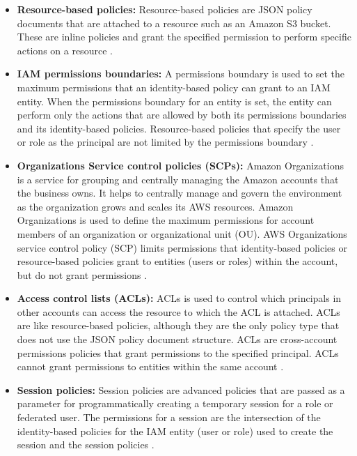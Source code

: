 \begin{itemize}
    \item \textbf{Resource-based policies:} Resource-based policies are JSON policy documents that are attached to a
    resource
    such as an Amazon S3 bucket. These are inline policies and grant the specified permission to perform specific actions on a resource \cite{25}.
\end{itemize}
\begin{itemize}
    \item \textbf{IAM permissions boundaries:} A permissions boundary is used to set the maximum permissions that an
    identity-based policy can grant to an IAM entity. When the permissions boundary for an entity is set, the entity can perform only the actions that are allowed by both its permissions boundaries and its identity-based policies. Resource-based policies that specify the user or role as the principal are not limited by the permissions boundary \cite{25}.
\end{itemize}
\begin{itemize}
    \item \textbf{Organizations Service control policies (SCPs):} Amazon Organizations is a service for grouping and centrally managing the Amazon accounts that the business owns. It helps to centrally manage and govern the environment as the organization grows and scales its AWS resources. Amazon Organizations is used to define the maximum permissions for account members of an organization or organizational unit (OU). AWS Organizations service control policy (SCP) limits permissions that identity-based policies or resource-based policies grant to entities (users or roles) within the account, but do not grant permissions \cite{25}.
\end{itemize}
\begin{itemize}
    \item \textbf{Access control lists (ACLs):} ACLs is used to control which principals in other accounts can access
    the
    resource to which the ACL is attached. ACLs are like resource-based policies, although they are the only policy type that does not use the JSON policy document structure. ACLs are cross-account permissions policies that grant permissions to the specified principal. ACLs cannot grant permissions to entities within the same account \cite{25}.
\end{itemize}
\begin{itemize}
    \item \textbf{Session policies:} Session policies are advanced policies that are passed as a parameter for
    programmatically creating a temporary session for a role or federated user. The permissions for a session are the intersection of the identity-based policies for the IAM entity (user or role) used to create the session and the session policies \cite{25}.
\end{itemize}


